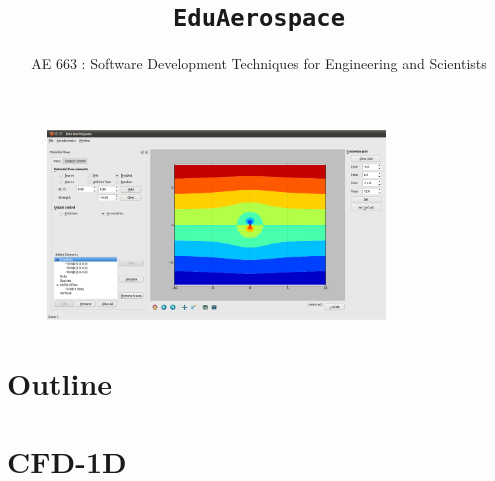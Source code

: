 \documentclass{beamer}
\title{\texttt{EduAerospace}}
\subtitle{AE 663 : Software Development Techniques for Engineering and Scientists}
\date{\empty}
\begin{document}
\begin{frame}[label = Titlepage]
	\titlepage
	\vspace*{-3cm}
	\begin{figure}
		\centering
		\includegraphics[width=0.8\textwidth]{Images/pic2.png}
	\end{figure}
\end{frame}

\section{Outline}
\begin{frame}[label = toc]
	\tableofcontents[pausesections]
\end{frame}
\section{CFD-1D}
\end{document}
